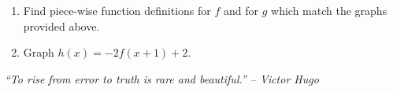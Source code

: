 \documentclass{book}
\begin{document}
\begin{enumerate}[!HW!]
\item\label{exer:composegraph:start} Find piece-wise function definitions for $f$ and for $g$ which match the graphs provided above.\\



\item\label{exer:composegraph:stop} Graph $h(x) = -2f(x+1)+2$.\\
\end{enumerate}
\pagebreak

\pagebreak

\begin{center} 
\emph{``To rise from error to truth is rare and beautiful.'' -- Victor Hugo}
\end{center}
\end{document}
